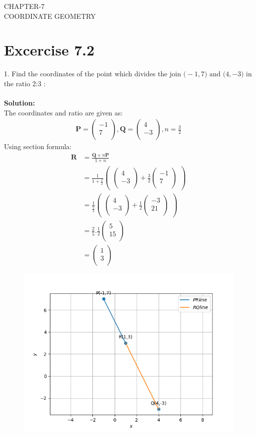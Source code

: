\documentclass[12pt]{article}
\newcommand{\solution}{\noindent \textbf{Solution: }}
\newcommand{\myvec}[1]{\ensuremath{\begin{pmatrix}#1\end{pmatrix}}}
\let\vec\mathbf
\begin{document}
\begin{center}
\textbf\large{CHAPTER-7 \\ COORDINATE GEOMETRY}
\end{center}
\section*{Excercise 7.2}

1. Find the coordinates of the point which divides the join $\vec(-1,7) \text{ and } \vec(4,-3)$ in the ratio 2:3 :
\\
\\
\solution\\		
The coordinates and ratio are given as:
\begin{align}
\vec{P}=\myvec{-1\\7\\},
\vec{Q}=\myvec{4\\-3\\},
n=\frac{3}{2}
\end{align}
Using section formula:
\begin{align}
\vec{R}&=\frac{\vec{Q}+n\vec{P}}{1+n}\\
&=\frac{1}{1+\frac{3}{2}}  \myvec{\myvec{
4\\
-3\\
}
  +
   \frac{3}{2}\myvec{
-1\\
7\\
}}\\
&= \frac{1}{\frac{5}{2}} \myvec{\myvec{
4\\
-3\\
}
  +
\frac{1}{2}\myvec{
-3\\
21\\
}} \\
&=\frac{2}{5}.\frac{1}{2}
\myvec{
5\\
15\\
}\\
&=\myvec{
1\\
3\\
}
\end{align}


\begin{figure}[!h]
\begin{center}
   \includegraphics[width=\columnwidth]{./figs/linefig.png}
\end{center}
\caption{}
\label{fig:Fig}
\end{figure}
\end{document}
